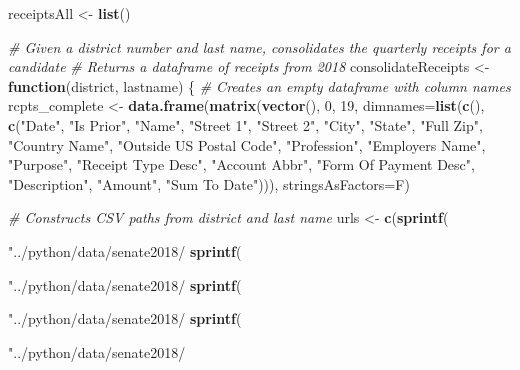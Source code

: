 \documentclass[
]{article}
\newenvironment{Shaded}{\begin{snugshade}}{\end{snugshade}}
\newcommand{\CommentTok}[1]{\textcolor[rgb]{0.56,0.35,0.01}{\textit{#1}}}
\newcommand{\ControlFlowTok}[1]{\textcolor[rgb]{0.13,0.29,0.53}{\textbf{#1}}}
\newcommand{\DataTypeTok}[1]{\textcolor[rgb]{0.13,0.29,0.53}{#1}}
\newcommand{\DecValTok}[1]{\textcolor[rgb]{0.00,0.00,0.81}{#1}}
\newcommand{\KeywordTok}[1]{\textcolor[rgb]{0.13,0.29,0.53}{\textbf{#1}}}
\newcommand{\NormalTok}[1]{#1}
\newcommand{\StringTok}[1]{\textcolor[rgb]{0.31,0.60,0.02}{#1}}
\begin{document}
\begin{Shaded}
\begin{Highlighting}[]
\NormalTok{receiptsAll <-}\StringTok{ }\KeywordTok{list}\NormalTok{()}

\CommentTok{# Given a district number and last name, consolidates the quarterly receipts for a candidate}
\CommentTok{# Returns a dataframe of receipts from 2018}
\NormalTok{consolidateReceipts <-}\StringTok{ }\ControlFlowTok{function}\NormalTok{(district, lastname) \{}
  \CommentTok{# Creates an empty dataframe with column names}
\NormalTok{  rcpts_complete <-}\StringTok{ }\KeywordTok{data.frame}\NormalTok{(}\KeywordTok{matrix}\NormalTok{(}\KeywordTok{vector}\NormalTok{(), }\DecValTok{0}\NormalTok{, }\DecValTok{19}\NormalTok{,}
                \DataTypeTok{dimnames=}\KeywordTok{list}\NormalTok{(}\KeywordTok{c}\NormalTok{(), }\KeywordTok{c}\NormalTok{(}\StringTok{"Date"}\NormalTok{, }\StringTok{"Is Prior"}\NormalTok{, }\StringTok{"Name"}\NormalTok{, }\StringTok{"Street 1"}\NormalTok{, }\StringTok{"Street 2"}\NormalTok{, }\StringTok{"City"}\NormalTok{, }\StringTok{"State"}\NormalTok{, }\StringTok{"Full Zip"}\NormalTok{, }
                                     \StringTok{"Country Name"}\NormalTok{, }\StringTok{"Outside US Postal Code"}\NormalTok{, }\StringTok{"Profession"}\NormalTok{, }\StringTok{"Employers Name"}\NormalTok{, }\StringTok{"Purpose"}\NormalTok{, }
                                     \StringTok{"Receipt Type Desc"}\NormalTok{, }\StringTok{"Account Abbr"}\NormalTok{, }\StringTok{"Form Of Payment Desc"}\NormalTok{, }\StringTok{"Description"}\NormalTok{, }\StringTok{"Amount"}\NormalTok{, }
                                     \StringTok{"Sum To Date"}\NormalTok{))),}
                \DataTypeTok{stringsAsFactors=}\NormalTok{F)}
  
    \CommentTok{# Constructs CSV paths from district and last name}
\NormalTok{    urls <-}\StringTok{ }\KeywordTok{c}\NormalTok{(}\KeywordTok{sprintf}\NormalTok{(}\StringTok{"../python/data/senate2018/%s/%s/q1.csv"}\NormalTok{, district, lastname),}
              \KeywordTok{sprintf}\NormalTok{(}\StringTok{"../python/data/senate2018/%s/%s/q2.csv"}\NormalTok{, district, lastname),}
              \KeywordTok{sprintf}\NormalTok{(}\StringTok{"../python/data/senate2018/%s/%s/q3.csv"}\NormalTok{, district, lastname),}
              \KeywordTok{sprintf}\NormalTok{(}\StringTok{"../python/data/senate2018/%s/%s/q4.csv"}\NormalTok{, district, lastname))}
    
}}}}
\end{Highlighting}
\end{Shaded}
\end{document}
